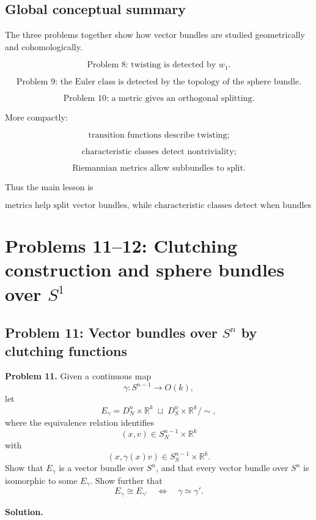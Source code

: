 \documentclass[12pt,a4paper]{article}
\theoremstyle{notespace}
\begin{document}
	\subsection{Global conceptual summary}
	
	The three problems together show how vector bundles are studied geometrically and cohomologically.
	
	\[
	\boxed{
		\text{Problem 8: twisting is detected by }w_{1}.
	}
	\]
	
	\[
	\boxed{
		\text{Problem 9: the Euler class is detected by the topology of the sphere bundle.}
	}
	\]
	
	\[
	\boxed{
		\text{Problem 10: a metric gives an orthogonal splitting.}
	}
	\]
	
	More compactly:
	
	\[
	\boxed{
		\text{transition functions describe twisting;}
	}
	\]
	
	\[
	\boxed{
		\text{characteristic classes detect nontriviality;}
	}
	\]
	
	\[
	\boxed{
		\text{Riemannian metrics allow subbundles to split.}
	}
	\]
	
	Thus the main lesson is
	
	\[
	\boxed{
		\text{metrics help split vector bundles, while characteristic classes detect when bundles cannot be trivialized.}
	}
	\]
	
\section{Problems 11--12: Clutching construction and sphere bundles over \(S^1\)}

\subsection{Problem 11: Vector bundles over \(S^n\) by clutching functions}

\textbf{Problem 11.}
Given a continuous map
\[
\gamma:S^{n-1}\longrightarrow O(k),
\]
let
\[
E_{\gamma}
=
D_N^n\times \mathbb{R}^k
\;\sqcup\;
D_S^n\times \mathbb{R}^k
\big/ \sim,
\]
where the equivalence relation identifies
\[
(x,v)\in S_N^{n-1}\times \mathbb{R}^k
\]
with
\[
(x,\gamma(x)v)\in S_S^{n-1}\times \mathbb{R}^k.
\]
Show that \(E_{\gamma}\) is a vector bundle over \(S^n\), and that every vector bundle over \(S^n\) is isomorphic to some \(E_{\gamma}\). Show further that
\[
E_{\gamma}\cong E_{\gamma'}
\quad\Longleftrightarrow\quad
\gamma\simeq \gamma'.
\]

\textbf{Solution.}
\end{document}
